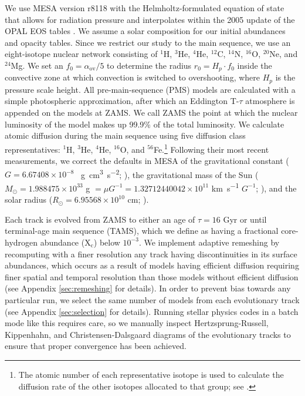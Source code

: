 \documentclass[manuscript]{aastex}
\begin{document}
We use MESA version r8118 with the Helmholtz-formulated equation of state that allows for radiation pressure and interpolates within the 2005 update of the OPAL EOS tables \citep{2002ApJ...576.1064R}. We assume a \citet{1998SSRv...85..161G} solar composition for our initial abundances and opacity tables. Since we restrict our study to the main sequence, we use an eight-isotope nuclear network consisting of $^1$H, $^3$He, $^4$He, $^{12}$C, $^{14}$N, $^{16}$O, $^{20}$Ne, and $^{24}$Mg. We set an $f_0 = \alpha_{\text{ov}}/5$ to determine the radius $r_0 = H_p \cdot f_0$ inside the convective zone at which convection is switched to overshooting, where $H_p$ is the pressure scale height. All pre-main-sequence (PMS) models are calculated with a simple photospheric approximation, after which an Eddington T-$\tau$ atmosphere is appended on the models at ZAMS. We call ZAMS the point at which the nuclear luminosity of the model makes up 99.9\% of the total luminosity. We calculate atomic diffusion during the main sequence using five diffusion class representatives: $^1$H, $^3$He, $^4$He, $^{16}$O, and $^{56}$Fe.\footnote{The atomic number of each representative isotope is used to calculate the diffusion rate of the other isotopes allocated to that group; see \citealt{Paxton2011}.} 
Following their most recent measurements, we correct the defaults in MESA of the gravitational constant ($G=6.67408\times 10^{-8}$ \si{\per\g\cm\cubed\per\square\s}; \citealt{2015arXiv150707956M}), the gravitational mass of the Sun ($M_\odot = 1.988475\times 10^{33}$ \si{\g} $= \mu G^{-1} = 1.32712440042\times 10^{11}$ \si{\km\per\s} $G^{-1}$; \citealt{pitjeva2015determination}), and the solar radius ($R_\odot = 6.95568\times 10^{10}$ \si{\cm}; \citealt{2008ApJ...675L..53H}). 

Each track is evolved from ZAMS to either an age of $\tau=16$ Gyr or until terminal-age main sequence (TAMS), which we define as having a fractional core-hydrogen abundance (X$_{\text{c}}$) below $10^{-3}$. We implement adaptive remeshing by recomputing with a finer resolution any track having discontinuities in its surface abundances, which occurs as a result of models having efficient diffusion requiring finer spatial and temporal resolution than those models without efficient diffusion (see Appendix \ref{sec:remeshing} for details). In order to prevent bias towards any particular run, we select the same number of models from each evolutionary track (see Appendix \ref{sec:selection} for details). Running stellar physics codes in a batch mode like this requires care, so we manually inspect Hertzsprung-Russell, Kippenhahn, and Christensen-Dalsgaard diagrams of the evolutionary tracks to ensure that proper convergence has been achieved. 
\end{document}
